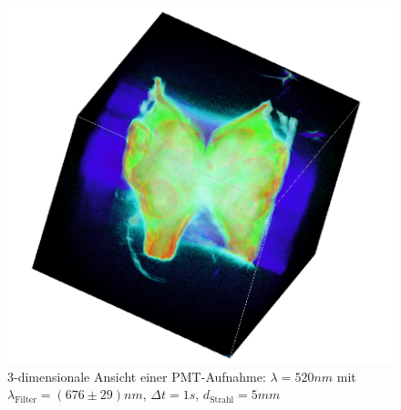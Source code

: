 \begin{figure}[ht]
\centering
\includegraphics[width=\linewidth]{IMAGE/3dtomo.png}
\caption{3-dimensionale Ansicht einer PMT-Aufnahme: $\lambda = 520 \si{nm}$ mit $\lambda_\text{Filter} = (676 \pm 29) \si{nm}$, $\Delta{t} = 1 \si{s}$, $d_\text{Strahl} = 5 \si{mm}$}
	\label{fig:3d}
\end{figure}




